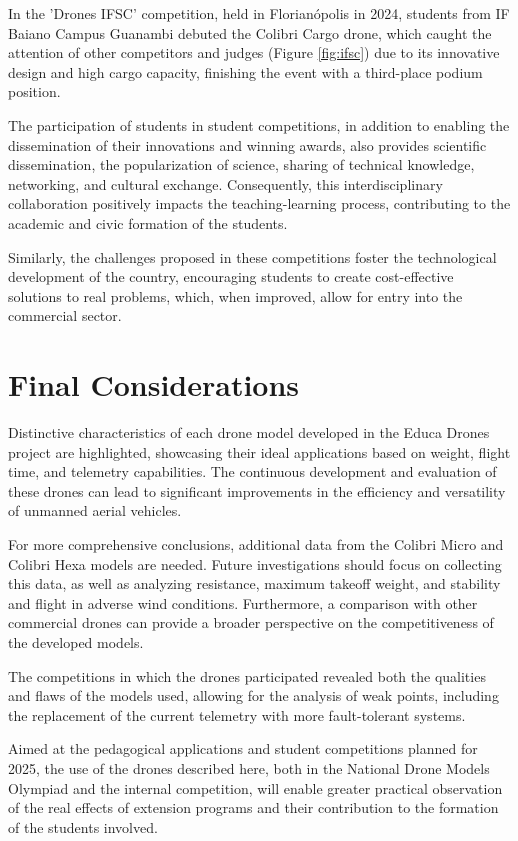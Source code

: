 \documentclass[conference]{IEEEtran}
\begin{document}
In the 'Drones IFSC' competition, held in Florianópolis in 2024, students from IF Baiano Campus Guanambi debuted the Colibri Cargo drone, which caught the attention of other competitors and judges (Figure \ref{fig:ifsc}) due to its innovative design and high cargo capacity, finishing the event with a third-place podium position.

The participation of students in student competitions, in addition to enabling the dissemination of their innovations and winning awards, also provides scientific dissemination, the popularization of science, sharing of technical knowledge, networking, and cultural exchange. Consequently, this interdisciplinary collaboration positively impacts the teaching-learning process, contributing to the academic and civic formation of the students.

Similarly, the challenges proposed in these competitions foster the technological development of the country, encouraging students to create cost-effective solutions to real problems, which, when improved, allow for entry into the commercial sector.

\section*{Final Considerations}

Distinctive characteristics of each drone model developed in the Educa Drones project are highlighted, showcasing their ideal applications based on weight, flight time, and telemetry capabilities. The continuous development and evaluation of these drones can lead to significant improvements in the efficiency and versatility of unmanned aerial vehicles.

For more comprehensive conclusions, additional data from the Colibri Micro and Colibri Hexa models are needed. Future investigations should focus on collecting this data, as well as analyzing resistance, maximum takeoff weight, and stability and flight in adverse wind conditions. Furthermore, a comparison with other commercial drones can provide a broader perspective on the competitiveness of the developed models.

The competitions in which the drones participated revealed both the qualities and flaws of the models used, allowing for the analysis of weak points, including the replacement of the current telemetry with more fault-tolerant systems.

Aimed at the pedagogical applications and student competitions planned for 2025, the use of the drones described here, both in the National Drone Models Olympiad and the internal competition, will enable greater practical observation of the real effects of extension programs and their contribution to the formation of the students involved.
\end{document}
